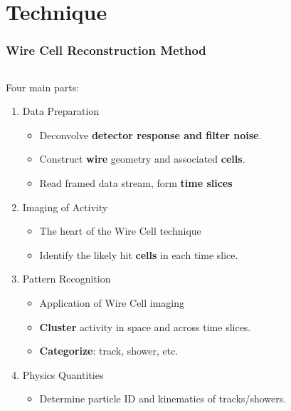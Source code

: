 \section{Technique}

\begin{frame}
\end{frame}


\begin{frame}[fragile]
  \frametitle{Wire Cell Reconstruction Method}
  \begin{columns}
    \begin{column}{0.7\textwidth}
      Four main parts:
      \begin{enumerate}
      \item<2> Data Preparation
        \begin{itemize}        \scriptsize
        \item Deconvolve \textbf{detector response and filter noise}.
        \item Construct \textbf{wire} geometry and associated \textbf{cells}.
        \item Read framed data stream, form \textbf{time slices}
        \end{itemize}
      \item<3> Imaging of Activity
        \begin{itemize}        \scriptsize
        \item The heart of the Wire Cell technique
        \item Identify the likely hit \textbf{cells} in each time slice.
        \end{itemize}
      \item<4> Pattern Recognition 
        \begin{itemize}         \scriptsize
        \item Application of Wire Cell imaging
        \item \textbf{Cluster} activity in space and across time slices.
        \item \textbf{Categorize}: track, shower, etc.
        \end{itemize}
      \item<5> Physics Quantities
        \begin{itemize}         \scriptsize
        \item Determine particle ID and kinematics of tracks/showers.
        \end{itemize}
      \end{enumerate}
    \end{column}
    \begin{column}{0.3\textwidth}
      \begin{center}
        \vspace{-10mm}
        \resizebox{!}{\textheight}{}
      \end{center}
    \end{column}
  \end{columns}

\end{frame}

